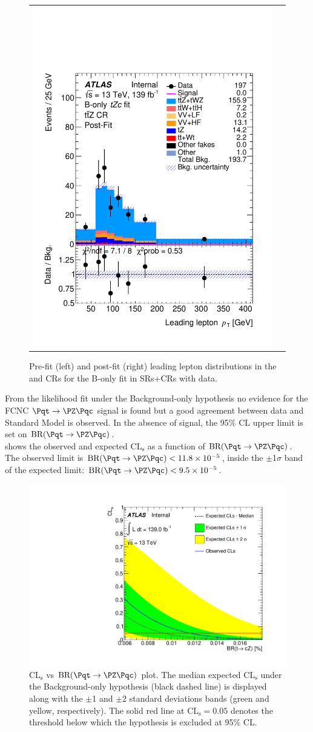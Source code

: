 \begin{figure}[htbp]
\begin{tabular}{cc}
		\includegraphics[width=.45\textwidth]{Appendices/AP9/figures/BONLY_CRSR_DL1rc_unblind/Plots/TTZCR_postFit} \\
	\end{tabular}
	\caption{Pre-fit (left) and post-fit (right) leading lepton \pt distributions in the \ttbar and \ttZ CRs for the B-only \tZc fit in SRs+CRs with data.
		\ErrStatSys
	}%
	\label{fig:stat:tzc:bonly:crsr:crplots:2_unb}
\end{figure}

\FloatBarrier
\clearpage
\noindent From the likelihood fit under the Background-only hypothesis no evidence for the FCNC $\mathrm{\Pqt\rightarrow\PZ\Pqc}$ signal is found but a good agreement between data and Standard Model is observed.
In the absence of signal, the 95\% CL upper limit is set on $\mathrm{BR (\Pqt\rightarrow\PZ\Pqc)}$.\\
 shows the observed and expected $\mathrm{CL_{s}}$ as a function of $\mathrm{BR (\Pqt\rightarrow\PZ\Pqc)}$.\\
The observed limit is $\mathrm{BR (\Pqt\rightarrow\PZ\Pqc)}<11.8\times 10^{-5}$, inside the $\pm$1$\sigma$ band of the expected limit: $\mathrm{BR (\Pqt\rightarrow\PZ\Pqc)}<9.5\times 10^{-5}$.
\begin{figure}[htbp]
	\centering
	\includegraphics[width=.6\textwidth]{Appendices/AP9/figures/BONLY_CRSR_DL1rc_unblind/CLsPlot}
	\caption{$\mathrm{CL_{s}}$ vs $\mathrm{BR (\Pqt\rightarrow\PZ\Pqc)}$ plot. The median expected $\mathrm{CL_{s}}$ under the Background-only hypothesis
		(black dashed line) is displayed along with the $\pm$1 and $\pm$2 standard deviations bands
		(green and yellow, respectively). The solid red line at $\mathrm{CL_{s}= 0.05}$ denotes the threshold below
		which the hypothesis is excluded at 95\% CL.}
	\label{fig:stat:tzc:bonly:crsr:CLsPlot}
\end{figure}

